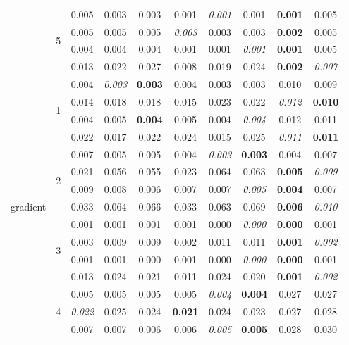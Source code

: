 \documentclass[authoryear, review, 11pt]{elsarticle}
\begin{document}
\begin{table}[ht]
\begin{center}
{\begin{tabular}{cccccccccc}
  \cline{3-10}
  & \multirow{4}{*}{5} & 0.005 & 0.003 & 0.003 & 0.001 & \emph{0.001} & 0.001 & \textbf{0.001} & 0.005 \\ 
  &  & 0.005 & 0.005 & 0.005 & \emph{0.003} & 0.003 & 0.003 & \textbf{0.002} & 0.005 \\ 
  &  & 0.004 & 0.004 & 0.004 & 0.001 & 0.001 & \emph{0.001} & \textbf{0.001} & 0.005 \\ 
  &  & 0.013 & 0.022 & 0.027 & 0.008 & 0.019 & 0.024 & \textbf{0.002} & \emph{0.007} \\ 
  \hline
  \multirow{20}{*}{gradient} & \multirow{4}{*}{1} & 0.004 & \emph{0.003} & \textbf{0.003} & 0.004 & 0.003 & 0.003 & 0.010 & 0.009 \\ 
  &  & 0.014 & 0.018 & 0.018 & 0.015 & 0.023 & 0.022 & \emph{0.012} & \textbf{0.010} \\ 
  &  & 0.004 & 0.005 & \textbf{0.004} & 0.005 & 0.004 & \emph{0.004} & 0.012 & 0.011 \\ 
  &  & 0.022 & 0.017 & 0.022 & 0.024 & 0.015 & 0.025 & \emph{0.011} & \textbf{0.011} \\ 
  \cline{3-10}
  & \multirow{4}{*}{2} & 0.007 & 0.005 & 0.005 & 0.004 & \emph{0.003} & \textbf{0.003} & 0.004 & 0.007 \\ 
  &  & 0.021 & 0.056 & 0.055 & 0.023 & 0.064 & 0.063 & \textbf{0.005} & \emph{0.009} \\ 
  &  & 0.009 & 0.008 & 0.006 & 0.007 & 0.007 & \emph{0.005} & \textbf{0.004} & 0.007 \\ 
  &  & 0.033 & 0.064 & 0.066 & 0.033 & 0.063 & 0.069 & \textbf{0.006} & \emph{0.010} \\ 
  \cline{3-10}
  & \multirow{4}{*}{3} & 0.001 & 0.001 & 0.001 & 0.001 & 0.000 & \emph{0.000} & \textbf{0.000} & 0.001 \\ 
  &  & 0.003 & 0.009 & 0.009 & 0.002 & 0.011 & 0.011 & \textbf{0.001} & \emph{0.002} \\ 
  &  & 0.001 & 0.001 & 0.000 & 0.001 & 0.000 & \emph{0.000} & \textbf{0.000} & 0.001 \\ 
  &  & 0.013 & 0.024 & 0.021 & 0.011 & 0.024 & 0.020 & \textbf{0.001} & \emph{0.002} \\ 
  \cline{3-10}
  & \multirow{4}{*}{4} & 0.005 & 0.005 & 0.005 & 0.005 & \emph{0.004} & \textbf{0.004} & 0.027 & 0.027 \\ 
  &  & \emph{0.022} & 0.025 & 0.024 & \textbf{0.021} & 0.024 & 0.023 & 0.027 & 0.028 \\ 
  &  & 0.007 & 0.007 & 0.006 & 0.006 & \emph{0.005} & \textbf{0.005} & 0.028 & 0.030 \\ 

\end{tabular}}
\end{center}
\end{table}
\end{document}
